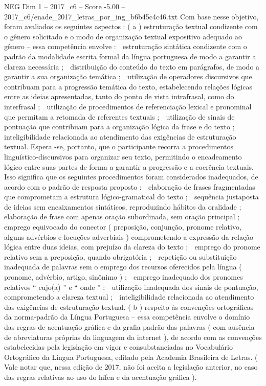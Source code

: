 \begin{textsample}{NEG Dim 1 – 2017\_c6 – Score -5.00 – 2017\_c6/enade\_2017\_letras\_por\_ing\_b6b45c4c46.txt}
Com base nesse objetivo, foram avaliados os seguintes aspectos : ( a ) estruturação textual condizente com o gênero solicitado e o modo de organização textual expositivo adequado ao gênero – essa competência envolve :  estruturação sintática condizente com o padrão da modalidade escrita formal da língua portuguesa de modo a garantir a clareza necessária ;  distribuição do conteúdo do texto em parágrafos, de modo a garantir a sua organização temática ;  utilização de operadores discursivos que contribuam para a progressão temática do texto, estabelecendo relações lógicas entre as ideias apresentadas, tanto do ponto de vista intrafrasal, como do interfrasal ;  utilização de procedimentos de referenciação lexical e pronominal que permitam a retomada de referentes textuais ;  utilização de sinais de pontuação que contribuam para a organização lógica da frase e do texto ;  inteligibilidade relacionada ao atendimento das exigências de estruturação textual.
Espera -se, portanto, que o participante recorra a procedimentos linguístico-discursivos para organizar seu texto, permitindo o encadeamento lógico entre suas partes de forma a garantir a progressão e a coerência textuais.
Isso significa que os seguintes procedimentos foram considerados inadequados, de acordo com o padrão de resposta proposto :  elaboração de frases fragmentadas que comprometam a estrutura lógico-gramatical do texto ;  sequência justaposta de ideias sem encaixamentos sintáticos, reproduzindo hábitos da oralidade ;  elaboração de frase com apenas oração subordinada, sem oração principal ;  emprego equivocado do conector ( preposição, conjunção, pronome relativo, alguns advérbios e locuções adverbiais ) comprometendo a expressão da relação lógica entre duas ideias, com prejuízo da clareza do texto ;  emprego do pronome relativo sem a preposição, quando obrigatória ;  repetição ou substituição inadequada de palavras sem o emprego dos recursos oferecidos pela língua ( pronome, advérbio, artigo, sinônimo ) ;  emprego inadequado dos pronomes relativos “ cujo(a) ” e “ onde ” ;  utilização inadequada dos sinais de pontuação, comprometendo a clareza textual ;  inteligibilidade relacionada ao atendimento das exigências de estruturação textual. ( b ) respeito às convenções ortográficas da norma-padrão da Língua Portuguesa – essa competência envolve o domínio das regras de acentuação gráfica e da grafia padrão das palavras ( com ausência de abreviaturas próprias da linguagem da internet ), de acordo com as convenções estabelecidas pela legislação em vigor e consubstanciadas no Vocabulário Ortográfico da Língua Portuguesa, editado pela Academia Brasileira de Letras. ( Vale notar que, nessa edição de 2017, não foi aceita a legislação anterior, no caso das regras relativas ao uso do hífen e da acentuação gráfica ).

\end{textsample}
